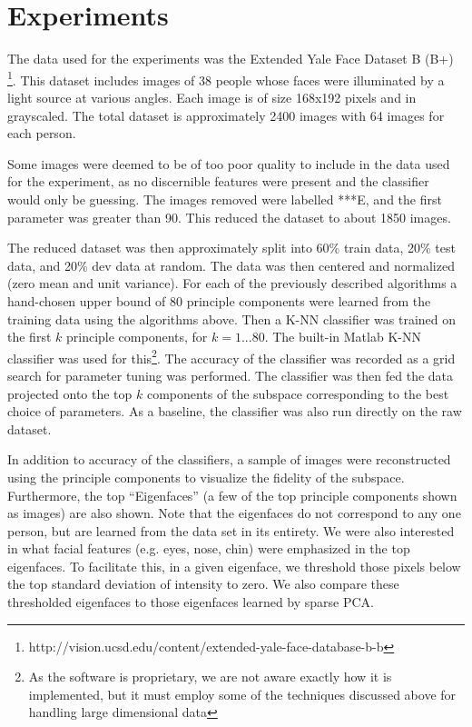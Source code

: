 \documentclass[11pt,letterpaper]{article}
\begin{document}
\section{Experiments}

The data used for the experiments was the Extended Yale Face Dataset B (B+) \footnote{{http://vision.ucsd.edu/content/extended-yale-face-database-b-b}}. This dataset includes images of 38 people whose faces were illuminated by a light source at various angles. Each image is of size 168x192 pixels and in grayscaled. The total dataset is approximately 2400 images with 64 images for each person. 

Some images were deemed to be of too poor quality to include in the data used for the experiment, as no discernible features were present and the classifier would only be guessing. The images removed were labelled  ***E, and the first parameter was greater than 90. This reduced the dataset to about 1850 images. 

The reduced dataset was then approximately split into 60\% train data, 20\% test data, and 20\% dev data at random. The data was then centered and normalized (zero mean and unit variance). For each of the previously described algorithms a hand-chosen upper bound of 80 principle components were learned from the training data using the algorithms above. Then a K-NN classifier was trained on the first $k$ principle components, for $k = 1 ... 80$. The built-in Matlab K-NN classifier was used for this\footnote{As the software is proprietary, we are not aware exactly how it is implemented, but it must employ some of the techniques discussed above for handling large dimensional data}. The accuracy of the classifier was recorded as a grid search for parameter tuning was performed. The classifier was then fed the data projected onto the top $k$ components of the subspace corresponding to the best choice of parameters. As a baseline, the classifier was also run directly on the raw dataset. 

In addition to accuracy of the classifiers, a sample of images were reconstructed using the principle components to visualize the fidelity of the subspace. Furthermore, the top ``Eigenfaces'' (a few of the top principle components shown as images) are also shown. Note that the eigenfaces do not correspond to any one person, but are learned from the data set in its entirety. We were also interested in what facial features (e.g. eyes, nose, chin) were emphasized in the top eigenfaces. To facilitate this, in a given eigenface, we threshold those pixels below the top standard deviation of intensity to zero. We also compare these thresholded eigenfaces to those eigenfaces learned by sparse PCA. 
\end{document}
